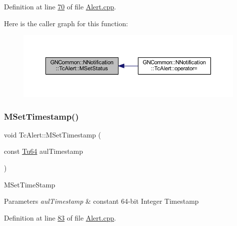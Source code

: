 Definition at line \mbox{\hyperlink{_alert_8cpp_source_l00070}{70}} of file \mbox{\hyperlink{_alert_8cpp_source}{Alert.\+cpp}}.

Here is the caller graph for this function\+:
\nopagebreak
\begin{figure}[H]
\begin{center}
\leavevmode
\includegraphics[width=350pt]{class_g_n_common_1_1_n_notification_1_1_tc_alert_a682a17a50fc2c50bfb92ec3eeafdb5c9_icgraph}
\end{center}
\end{figure}
\mbox{\label{class_g_n_common_1_1_n_notification_1_1_tc_alert_ac6ed25087bcdbb12921d71c2c4126131}} 
\subsubsection{\texorpdfstring{M\+Set\+Timestamp()}{MSetTimestamp()}}
{\footnotesize\ttfamily void Tc\+Alert\+::\+M\+Set\+Timestamp (\begin{DoxyParamCaption}\item[{const \mbox{\hyperlink{namespace_g_n_common_a9404ee6090c788ae70aebd1436ceb97d}{Tu64}}}]{aul\+Timestamp }\end{DoxyParamCaption})}

M\+Set\+Time\+Stamp 
\begin{DoxyParams}{Parameters}
{\em aul\+Timestamp} & constant 64-\/bit Integer Timestamp \\
\hline
\end{DoxyParams}


Definition at line \mbox{\hyperlink{_alert_8cpp_source_l00083}{83}} of file \mbox{\hyperlink{_alert_8cpp_source}{Alert.\+cpp}}.

